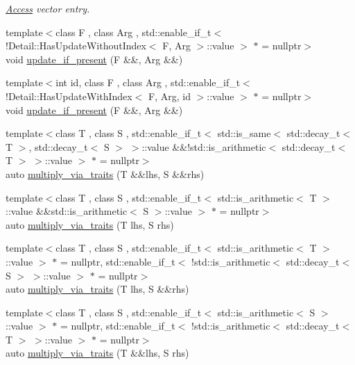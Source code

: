 \begin{DoxyCompactItemize}
\begin{DoxyCompactList}\small\item\em \hyperlink{namespaceFunG_1_1Access}{Access} vector entry. \end{DoxyCompactList}\item 
{\footnotesize template$<$class F , class Arg , std\+::enable\+\_\+if\+\_\+t$<$!\+Detail\+::\+Has\+Update\+Without\+Index$<$ F, Arg $>$\+::value $>$ $\ast$  = nullptr$>$ }\\void \hyperlink{namespaceFunG_a3b9d2e5d07b30c2ee26703b33e9adb9e}{update\+\_\+if\+\_\+present} (F \&\&, Arg \&\&)
\item 
{\footnotesize template$<$int id, class F , class Arg , std\+::enable\+\_\+if\+\_\+t$<$!\+Detail\+::\+Has\+Update\+With\+Index$<$ F, Arg, id $>$\+::value $>$ $\ast$  = nullptr$>$ }\\void \hyperlink{namespaceFunG_aed5ddbef97c98202e818bca2b74c75d2}{update\+\_\+if\+\_\+present} (F \&\&, Arg \&\&)
\item 
{\footnotesize template$<$class T , class S , std\+::enable\+\_\+if\+\_\+t$<$ std\+::is\+\_\+same$<$ std\+::decay\+\_\+t$<$ T $>$, std\+::decay\+\_\+t$<$ S $>$ $>$\+::value \&\&!std\+::is\+\_\+arithmetic$<$ std\+::decay\+\_\+t$<$ T $>$ $>$\+::value $>$ $\ast$  = nullptr$>$ }\\auto \hyperlink{namespaceFunG_a839a72c59a888ed89d3efe38897cc376}{multiply\+\_\+via\+\_\+traits} (T \&\&lhs, S \&\&rhs)
\item 
{\footnotesize template$<$class T , class S , std\+::enable\+\_\+if\+\_\+t$<$ std\+::is\+\_\+arithmetic$<$ T $>$\+::value \&\&std\+::is\+\_\+arithmetic$<$ S $>$\+::value $>$ $\ast$  = nullptr$>$ }\\auto \hyperlink{namespaceFunG_a95f9f46143d0a53a378f776e300c3520}{multiply\+\_\+via\+\_\+traits} (T lhs, S rhs)
\item 
{\footnotesize template$<$class T , class S , std\+::enable\+\_\+if\+\_\+t$<$ std\+::is\+\_\+arithmetic$<$ T $>$\+::value $>$ $\ast$  = nullptr, std\+::enable\+\_\+if\+\_\+t$<$ !std\+::is\+\_\+arithmetic$<$ std\+::decay\+\_\+t$<$ S $>$ $>$\+::value $>$ $\ast$  = nullptr$>$ }\\auto \hyperlink{namespaceFunG_a780ef12ebddaa8e729d8629d24ae76c5}{multiply\+\_\+via\+\_\+traits} (T lhs, S \&\&rhs)
\item 
{\footnotesize template$<$class T , class S , std\+::enable\+\_\+if\+\_\+t$<$ std\+::is\+\_\+arithmetic$<$ S $>$\+::value $>$ $\ast$  = nullptr, std\+::enable\+\_\+if\+\_\+t$<$ !std\+::is\+\_\+arithmetic$<$ std\+::decay\+\_\+t$<$ T $>$ $>$\+::value $>$ $\ast$  = nullptr$>$ }\\auto \hyperlink{namespaceFunG_af9f50220300eacbd554ec4b48373535b}{multiply\+\_\+via\+\_\+traits} (T \&\&lhs, S rhs)

\end{DoxyCompactItemize}
